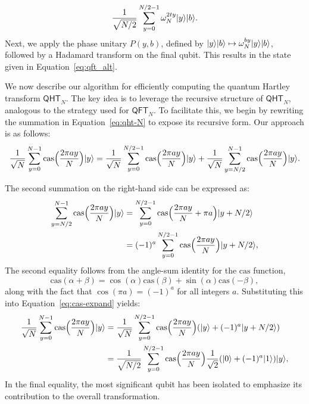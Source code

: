 \documentclass[12pt]{report}
\newcommand{\cas}{\mathrm{cas}}
\newcommand{\qht}{\mathsf{QHT}}
\newcommand{\qft}{\mathsf{QFT}}
\begin{document}
\[ \frac{1}{\sqrt{N / 2}} \sum_{y = 0}^{N / 2 - 1} \omega_N^{2ty} \lvert y\rangle \lvert b\rangle. \]
Next, we apply the phase unitary \( P(y, b) \), defined by \( \lvert y\rangle \lvert b\rangle \mapsto \omega_N^{by} \lvert y\rangle \lvert b\rangle \), followed by a Hadamard transform on the final qubit. This results in the state given in Equation~\eqref{eq:qft_alt}.


We now describe our algorithm for efficiently computing the quantum Hartley transform \( \qht_N \). The key idea is to leverage the recursive structure of \( \qht_N \), analogous to the strategy used for \( \qft_N \). To facilitate this, we begin by rewriting the summation in Equation~\eqref{eq:qht-N} to expose its recursive form. Our approach is as follows:
\begin{equation}
    \label{eq:cas-expand}
	\frac{1}{\sqrt{N}} \sum_{y = 0}^{N - 1} \cas\Big( \frac{2\pi a y}{N} \Big) \ket{y}
    = \frac{1}{\sqrt{N}} \sum_{y = 0}^{N / 2 - 1} \cas\Big( \frac{2\pi a y}{N} \Big) \ket{y} + \frac{1}{\sqrt{N}} \sum_{y = N / 2}^{N - 1} \cas\Big( \frac{2\pi a y}{N} \Big) \ket{y}.
\end{equation}



The second summation on the right-hand side can be expressed as:
\begin{align*}
	\sum_{y = N / 2}^{N - 1} \cas\Big( \frac{2\pi a y}{N} \Big) \ket{y}
    & = \sum_{y = 0}^{N / 2 - 1} \cas\Big( \frac{2\pi a y}{N} + \pi a \Big) \ket{y + N/2} \\
    & = (-1)^a \sum_{y = 0}^{N / 2 - 1} \cas\Big( \frac{2\pi a y}{N} \Big) \ket{y + N/2},
\end{align*}
The second equality follows from the angle-sum identity for the \( \cas \) function,
\[
\cas(\alpha + \beta) = \cos(\alpha)\cas(\beta) + \sin(\alpha)\cas(-\beta),
\]
along with the fact that \( \cos(\pi a) = (-1)^a \) for all integers \( a \). Substituting this into Equation~\eqref{eq:cas-expand} yields:
\begin{align}
	\frac{1}{\sqrt{N}} \sum_{y = 0}^{N - 1} \cas\Big( \frac{2\pi a y}{N} \Big) \ket{y}
    & = \frac{1}{\sqrt{N}} \sum_{y = 0}^{N / 2 - 1} \cas\Big( \frac{2\pi a y}{N} \Big) (\ket{y} + (-1)^a \ket{y + N/2}) \nonumber \\
    & = \frac{1}{\sqrt{N / 2}} \sum_{y = 0}^{N / 2 - 1} \cas\Big( \frac{2\pi a y}{N} \Big) \frac{1}{\sqrt{2}} (\ket{0} + (-1)^a \ket{1}) \ket{y}, \label{eq:qht-alt} 
\end{align}
In the final equality, the most significant qubit has been isolated to emphasize its contribution to the overall transformation.
\end{document}
